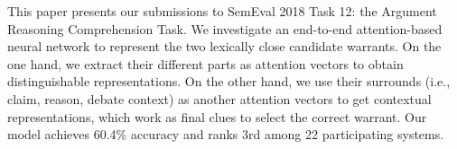This paper presents our submissions to SemEval 2018 Task 12: the Argument Reasoning Comprehension Task. We investigate an end-to-end attention-based neural network to represent the two lexically close candidate warrants. On the one hand, we extract their different parts as attention vectors to obtain distinguishable representations. On the other hand, we use their surrounds (i.e., claim, reason, debate context) as another attention vectors to get contextual representations, which work as final clues to select the correct warrant. Our model achieves 60.4\% accuracy and ranks 3rd among 22 participating systems.
